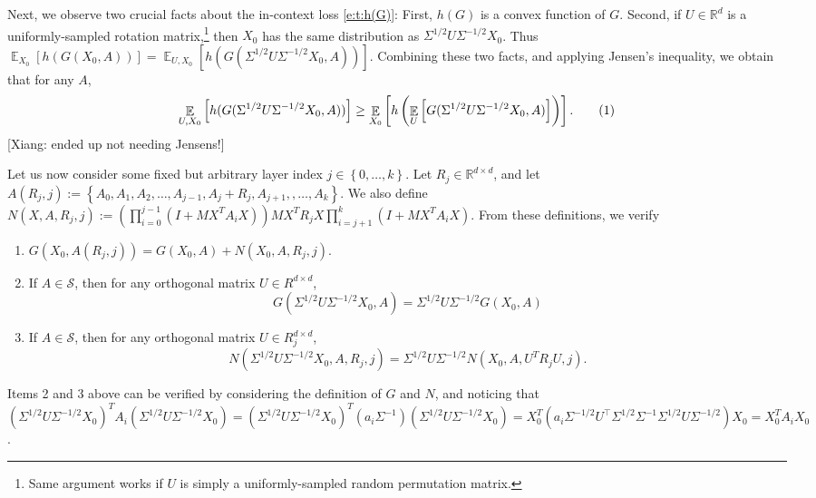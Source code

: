 \documentclass{article}
\DeclareMathOperator{\E}{\mathbb{E}}
\newcommand{\R}{\mathbb{R}}
\renewcommand{\S}{{\mathcal S}}
\newcommand*\lrb[1]{\left[ #1 \right]}
\newcommand*\lrp[1]{\left( #1 \right)}
\newcommand*\lrbb[1]{\left\{ #1 \right\}}
\newcommand\numberthis{\addtocounter{equation}{1}\tag{\theequation}}
\newcommand{\xc}[1]{{\color{black!2!green} [Xiang: #1]}}
\begin{document}
Next, we observe two crucial facts about the in-context loss \eqref{e:t:h(G)}: First, $h(G)$ is a convex function of $G$. Second, if $U \in \R^d$ is a uniformly-sampled rotation matrix,\footnote{Same argument works if $U$ is simply a uniformly-sampled random permutation matrix.} then $X_0$ has the same distribution as $\Sigma^{1/2} U \Sigma^{-1/2} X_0$. Thus $\E_{X_0}\lrb{h(G(X_0,A))} = \E_{U, X_0}\lrb{h(G(\Sigma^{1/2} U \Sigma^{-1/2} X_0,A))}$. Combining these two facts, and applying Jensen's inequality, we obtain that for any $A$,
\begin{align*}
\E_{U, X_0}\lrb{h(G(\Sigma^{1/2} U \Sigma^{-1/2} X_0,A))} \geq \E_{X_0}\lrb{h\lrp{\E_{U}\lrb{G(\Sigma^{1/2} U \Sigma^{-1/2} X_0,A)}}}.
\numberthis \label{e:t:jensen_pnull}
\end{align*}
\xc{ended up not needing Jensens!}


Let us now consider some fixed but arbitrary layer index $j \in \lrbb{0,\dots,k}$. Let $R_j\in \R^{d\times d}$, and let $A(R_j,j) := \lrbb{A_0, A_1, A_2,\dots, A_{j-1}, A_j + R_j, A_{j+1}, ,\dots, A_k}$. We also define $N(X, A, R_j, j):= \lrp{\prod_{i=0}^{j-1} (I + M X^T A_i X)} M X^T R_j X \prod_{i=j+1}^k (I + M X^T A_i X)$. From these definitions, we verify
\begin{enumerate}
\item $G(X_0, A(R_j,j)) = G(X_0,  A) + N(X_0, A, R_j, j)$.
\item If $A\in \S$, then for any orthogonal matrix $U \in R^{d\times d}$,  
$$G(\Sigma^{1/2} U \Sigma^{-1/2} X_0, A) = \Sigma^{1/2} U \Sigma^{-1/2} G(X_0,A)$$

\item If $A\in \S$, then for any orthogonal matrix $U \in R_j^{d\times d}$, 
$$N(\Sigma^{1/2} U \Sigma^{-1/2} X_0, A, R_j, j) = \Sigma^{1/2} U \Sigma^{-1/2} N(X_0, A, U^T R_j U, j).$$
\end{enumerate}
Items 2 and 3 above can be verified by considering the definition of $G$ and $N$, and noticing that $(\Sigma^{1/2} U \Sigma^{-1/2} X_0)^T A_i (\Sigma^{1/2} U \Sigma^{-1/2} X_0) = (\Sigma^{1/2} U \Sigma^{-1/2} X_0)^T (a_i \Sigma^{-1}) (\Sigma^{1/2} U \Sigma^{-1/2} X_0) = X_0^T (a_i \Sigma^{-1/2} U^\top \Sigma^{1/2} \Sigma^{-1} \Sigma^{1/2} U \Sigma^{-1/2}) X_0 = X_0^T A_i X_0$.
\end{document}
